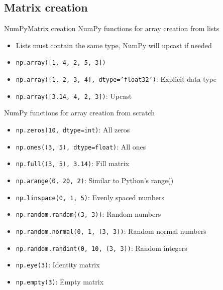 \documentclass[10pt,compress]{beamer} %
\begin{document}
\subsection{Matrix creation}
\begin{frame}[fragile]{NumPy}{Matrix creation}
	NumPy functions for array creation from lists
	\begin{itemize}
		\item Lists must contain the same type, NumPy will upcast if needed
		\item \texttt{np.array([1, 4, 2, 5, 3])}
		\item \texttt{np.array([1, 2, 3, 4], dtype='float32')}: Explicit data type
		\item \texttt{np.array([3.14, 4, 2, 3])}: Upcast
	\end{itemize}
	NumPy functions for array creation from scratch
	\begin{itemize}
		\item \texttt{np.zeros(10, dtype=int)}: All zeros
		\item \texttt{np.ones((3, 5), dtype=float)}: All ones
		\item \texttt{np.full((3, 5), 3.14)}: Fill matrix
		\item \texttt{np.arange(0, 20, 2)}: Similar to Python's range()
		\item \texttt{np.linspace(0, 1, 5)}: Evenly spaced numbers
		\item \texttt{np.random.random((3, 3))}: Random numbers
		\item \texttt{np.random.normal(0, 1, (3, 3))}: Random normal numbers
		\item \texttt{np.random.randint(0, 10, (3, 3))}: Random integers
		\item \texttt{np.eye(3)}: Identity matrix
		\item \texttt{np.empty(3)}: Empty matrix
	\end{itemize}
\end{frame}
\end{document}
